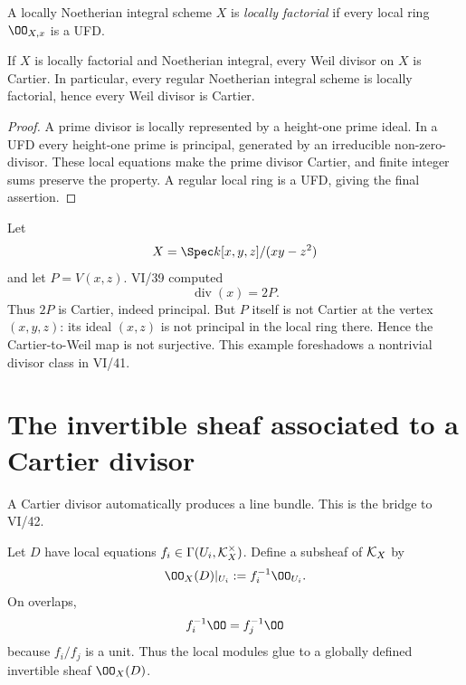 \begin{definition}\label{def:vi40-locally-factorial}
A locally Noetherian integral scheme \(X\) is \emph{locally factorial} if every local ring \(\OO_{X,x}\) is a UFD.
\end{definition}

\begin{theorem}\label{thm:vi40-factorial-weil-cartier}
If \(X\) is locally factorial and Noetherian integral, every Weil divisor on \(X\) is Cartier.  In particular, every regular Noetherian integral scheme is locally factorial, hence every Weil divisor is Cartier.
\end{theorem}

\begin{proof}
A prime divisor is locally represented by a height-one prime ideal.  In a UFD every height-one prime is principal, generated by an irreducible non-zero-divisor.  These local equations make the prime divisor Cartier, and finite integer sums preserve the property.  A regular local ring is a UFD, giving the final assertion.
\end{proof}

\begin{example}\label{ex:vi40-a1-singularity}
Let
\[
 X=\Spec k[x,y,z]/(xy-z^2)
\]
and let \(P=V(x,z)\).  VI/39 computed
\[
 \operatorname{div}(x)=2P.
\]
Thus \(2P\) is Cartier, indeed principal.  But \(P\) itself is not Cartier at the vertex \((x,y,z)\): its ideal \((x,z)\) is not principal in the local ring there.  Hence the Cartier-to-Weil map is not surjective.  This example foreshadows a nontrivial divisor class in VI/41.
\end{example}



\section{The invertible sheaf associated to a Cartier divisor}
A Cartier divisor automatically produces a line bundle.  This is the bridge to VI/42.

\begin{construction}\label{con:vi40-oxd}
Let \(D\) have local equations \(f_i\in\Gamma(U_i,\mathcal{K}_X^\times)\).  Define a subsheaf of \(\mathcal{K}_X\) by
\[
 \OO_X(D)|_{U_i}:=f_i^{-1}\OO_{U_i}.
\]
On overlaps,
\[
 f_i^{-1}\OO=f_j^{-1}\OO
\]
because \(f_i/f_j\) is a unit.  Thus the local modules glue to a globally defined invertible sheaf \(\OO_X(D)\).
\end{construction}

